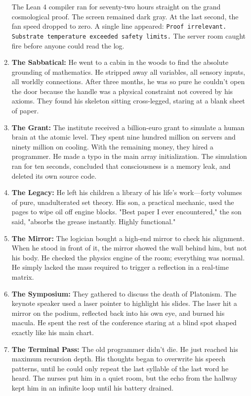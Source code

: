 \documentclass[12pt,a4paper]{article}
\begin{document}
\begin{multicols}{2}
\begin{enumerate}
The Lean 4 compiler ran for seventy-two hours straight on the grand cosmological proof. The screen remained dark gray. At the last second, the fan speed dropped to zero. A single line appeared: \texttt{Proof irrelevant. Substrate temperature exceeded safety limits.} The server room caught fire before anyone could read the log.\item \textbf{The Sabbatical:} He went to a cabin in the woods to find the absolute grounding of mathematics. He stripped away all variables, all sensory inputs, all worldly connections. After three months, he was so pure he couldn't open the door because the handle was a physical constraint not covered by his axioms. They found his skeleton sitting cross-legged, staring at a blank sheet of paper.\item \textbf{The Grant:} The institute received a billion-euro grant to simulate a human brain at the atomic level. They spent nine hundred million on servers and ninety million on cooling. With the remaining money, they hired a programmer. He made a typo in the main array initialization. The simulation ran for ten seconds, concluded that consciousness is a memory leak, and deleted its own source code.\item \textbf{The Legacy:} He left his children a library of his life's work—forty volumes of pure, unadulterated set theory. His son, a practical mechanic, used the pages to wipe oil off engine blocks. "Best paper I ever encountered," the son said, "absorbs the grease instantly. Highly functional."\item \textbf{The Mirror:} The logician bought a high-end mirror to check his alignment. When he stood in front of it, the mirror showed the wall behind him, but not his body. He checked the physics engine of the room; everything was normal. He simply lacked the mass required to trigger a reflection in a real-time matrix.\item \textbf{The Symposium:} They gathered to discuss the death of Platonism. The keynote speaker used a laser pointer to highlight his slides. The laser hit a mirror on the podium, reflected back into his own eye, and burned his macula. He spent the rest of the conference staring at a blind spot shaped exactly like his main chart.\item \textbf{The Terminal Pass:} The old programmer didn't die. He just reached his maximum recursion depth. His thoughts began to overwrite his speech patterns, until he could only repeat the last syllable of the last word he heard. The nurses put him in a quiet room, but the echo from the hallway kept him in an infinite loop until his battery drained.\end{enumerate}\end{multicols}
\end{document}
